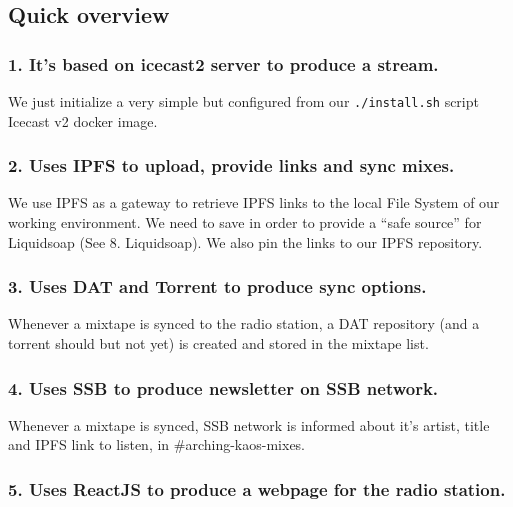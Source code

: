 \documentclass[12pt]{report}
\begin{document}
\subsection{Quick overview}\label{quick-overview}


\subsubsection{1. It's based on icecast2 server to produce a
stream.}\label{its-based-on-icecast2-server-to-produce-a-stream.}

We just initialize a very simple but configured from our
\texttt{./install.sh} script Icecast v2 docker image.


\subsubsection{2. Uses IPFS to upload, provide links and sync
mixes.}\label{uses-ipfs-to-upload-provide-links-and-sync-mixes.}

We use IPFS as a gateway to retrieve IPFS links to the local File System
of our working environment. We need to save in order to provide a ``safe
source'' for Liquidsoap (See 8. Liquidsoap). We also pin the links to
our IPFS repository.


\subsubsection{3. Uses DAT and Torrent to produce sync
options.}\label{uses-dat-and-torrent-to-produce-sync-options.}

Whenever a mixtape is synced to the radio station, a DAT repository (and
a torrent should but not yet) is created and stored in the mixtape list.


\subsubsection{4. Uses SSB to produce newsletter on SSB
network.}\label{uses-ssb-to-produce-newsletter-on-ssb-network.}

Whenever a mixtape is synced, SSB network is informed about it's artist,
title and IPFS link to listen, in \#arching-kaos-mixes.


\subsubsection{5. Uses ReactJS to produce a webpage for the radio
station.}\label{uses-reactjs-to-produce-a-webpage-for-the-radio-station.}
\end{document}
